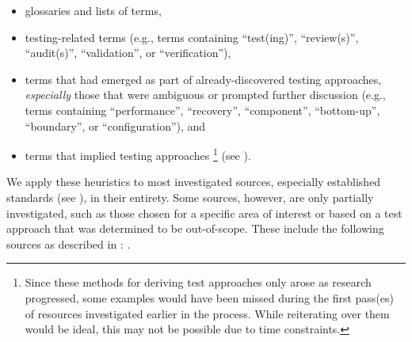 \begin{itemize}
    \item glossaries and lists of terms,
    \item testing-related terms (e.g., terms containing ``test(ing)'',
          \ifnotpaper ``review(s)'', ``audit(s)'', \fi
          ``validation'', or ``verification''),
    \item terms that had emerged as part of already-discovered
          testing approaches, \emph{especially} those that were ambiguous
          or prompted further discussion (e.g., terms containing
          ``performance'', ``recovery'', ``component'', ``bottom-up'',
          \ifnotpaper ``boundary'', \fi or ``configuration''), and
    \item terms that implied testing approaches%
          \ifnotpaper\footnote{
                  Since these methods for deriving test approaches only arose
                  as research progressed, some examples would have been missed
                  during the first pass(es) of resources investigated earlier
                  in the process. While reiterating over them would be ideal,
                  this may not be possible due to time constraints.
              } (see )\fi.
\end{itemize}
We apply these heuristics to most investigated sources, especially established
standards (see ), in their entirety. Some sources, however, are only
partially investigated, such as those chosen for a specific area of
interest or based on a test approach that was determined to be out-of-scope.
These include the following sources as described in :
\citep{ISO2022,ISO2015,Dominguez-PumarEtAl2020,PierreEtAl2017,
    TrudnowskiEtAl2017,YuEtAl2011,Tsui2007,Goralski1999}.

